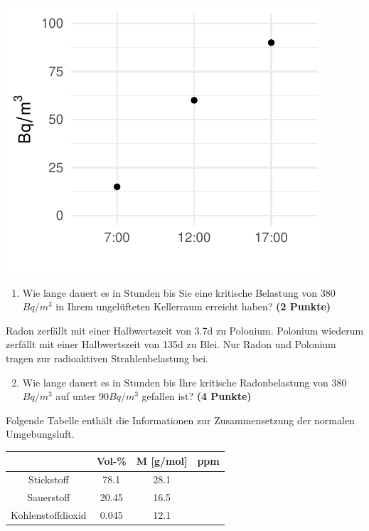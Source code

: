 \documentclass[a4paper, 9pt]{scrartcl}\usepackage[]{graphicx}\usepackage[]{xcolor}
\makeatletter
\def\maxwidth{ %
  \ifdim\Gin@nat@width>\linewidth
    \linewidth
  \else
    \Gin@nat@width
  \fi
}
\newenvironment{knitrout}{}{} %
\makeatother
\begin{document}
\begin{knitrout}
\color{fgcolor}

{\centering \includegraphics[width=\maxwidth]{img/math-10-1} 

}


\end{knitrout}

\vspace{-0.75cm}

\begin{enumerate}
\item Wie lange dauert es in Stunden bis Sie eine kritische Belastung von
  380$Bq/m^3$ in Ihrem ungelüfteten Kellerraum erreicht haben?
  \textbf{(2 Punkte)}
\end{enumerate}

Radon zerfällt mit einer Halbwertszeit von 3.7d zu
Polonium. Polonium wiederum zerfällt mit einer Halbwertszeit von
135d zu Blei. Nur Radon und Polonium tragen zur
radioaktiven Strahlenbelastung bei.

\begin{enumerate}
  \setcounter{enumi}{1}
\item Wie lange dauert es in Stunden bis Ihre kritische Radonbelastung von
  380$Bq/m^3$ auf unter 90$Bq/m^3$ gefallen ist?
  \textbf{(4 Punkte)}
\end{enumerate}

Folgende Tabelle enthält die Informationen zur Zusammensetzung der
normalen Umgebungsluft.

\begin{center}
  \begin{tabular}{ c|c|c|c }
     & Vol-\% & M [g/mol] & ppm \\
    \hline
    Stickstoff & 78.1 & 28.1 &
                                                    \phantom{1000000000000}\strut\\
        \hline
    Sauerstoff & 20.45 & 16.5 &
                                                    \phantom{10000000}\strut\\
        \hline
    Kohlenstoffdioxid & 0.045 & 12.1 & \phantom{10000000}\strut\\     
     \hline
\end{tabular}
\end{center}
\end{document}
